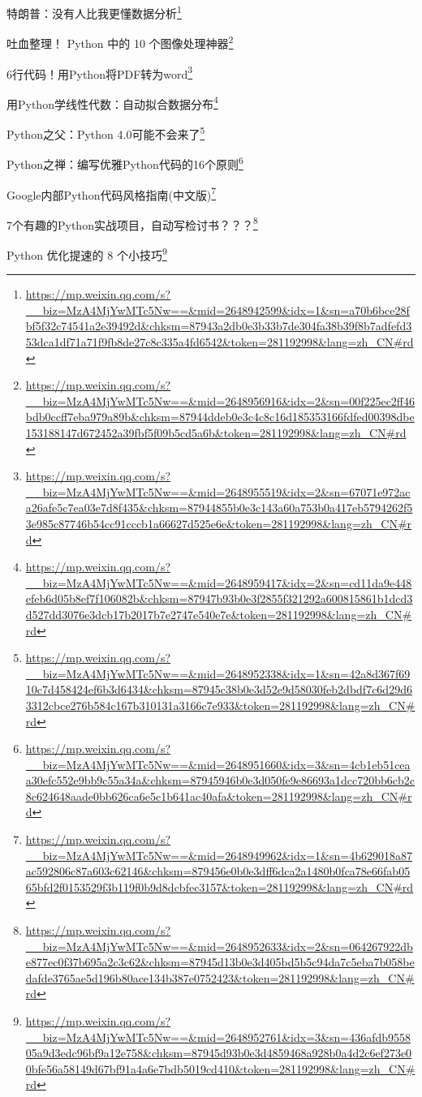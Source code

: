 \documentclass[]{ctexbook}
\renewcommand{\href}[2]{#2\footnote{\url{#1}}}
\begin{document}
\href{https://mp.weixin.qq.com/s?__biz=MzA4MjYwMTc5Nw==\&mid=2648942599\&idx=1\&sn=a70b6bce28fbf5f32c74541a2e39492d\&chksm=87943a2db0e3b33b7de304fa38b39f8b7adfefd353dca1df71a71f9fb8de27c8c335a4fd6542\&token=281192998\&lang=zh_CN\#rd}{特朗普：没有人比我更懂数据分析}

\href{https://mp.weixin.qq.com/s?__biz=MzA4MjYwMTc5Nw==\&mid=2648956916\&idx=2\&sn=00f225ec2ff46bdb0ccff7eba979a89b\&chksm=87944ddeb0e3c4c8c16d185353166fdfed00398dbe153188147d672452a39fbf5f09b5cd5a6b\&token=281192998\&lang=zh_CN\#rd}{吐血整理！ Python 中的 10 个图像处理神器}

\href{https://mp.weixin.qq.com/s?__biz=MzA4MjYwMTc5Nw==\&mid=2648955519\&idx=2\&sn=67071e972aca26afe5c7ea03e7d8f435\&chksm=87944855b0e3c143a60a753b0a417eb5794262f53e985c87746b54cc91cccb1a66627d525e6e\&token=281192998\&lang=zh_CN\#rd}{6行代码！用Python将PDF转为word}

\href{https://mp.weixin.qq.com/s?__biz=MzA4MjYwMTc5Nw==\&mid=2648959417\&idx=2\&sn=cd11da9e448efeb6d05b8ef7f106082b\&chksm=87947b93b0e3f2855f321292a600815861b1dcd3d527dd3076e3dcb17b2017b7e2747e540e7e\&token=281192998\&lang=zh_CN\#rd}{用Python学线性代数：自动拟合数据分布}

\href{https://mp.weixin.qq.com/s?__biz=MzA4MjYwMTc5Nw==\&mid=2648952338\&idx=1\&sn=42a8d367f6910c7d458424ef6b3d6434\&chksm=87945c38b0e3d52e9d58030feb2dbdf7c6d29d63312cbce276b584c167b310131a3166c7e933\&token=281192998\&lang=zh_CN\#rd}{Python之父：Python 4.0可能不会来了}

\href{https://mp.weixin.qq.com/s?__biz=MzA4MjYwMTc5Nw==\&mid=2648951660\&idx=3\&sn=4cb1eb51ceaa30efc552e9bb9c55a34a\&chksm=87945946b0e3d050fe9e86693a1dcc720bb6cb2c8c624648aade0bb626ca6e5c1b641ac40afa\&token=281192998\&lang=zh_CN\#rd}{Python之禅：编写优雅Python代码的16个原则}

\href{https://mp.weixin.qq.com/s?__biz=MzA4MjYwMTc5Nw==\&mid=2648949962\&idx=1\&sn=4b629018a87ac592806c87a603c62146\&chksm=879456e0b0e3dff6dca2a1480b0fca78e66fab0565bfd2f0153529f3b119f0b9d8dcbfec3157\&token=281192998\&lang=zh_CN\#rd}{Google内部Python代码风格指南(中文版)}

\href{https://mp.weixin.qq.com/s?__biz=MzA4MjYwMTc5Nw==\&mid=2648952633\&idx=2\&sn=064267922dbe877ec0f37b695a2c3c62\&chksm=87945d13b0e3d405bd5b5c94da7c5eba7b058bedafde3765ae5d196b80ace134b387e0752423\&token=281192998\&lang=zh_CN\#rd}{7个有趣的Python实战项目，自动写检讨书？？？}

\href{https://mp.weixin.qq.com/s?__biz=MzA4MjYwMTc5Nw==\&mid=2648952761\&idx=3\&sn=436afdb955805a9d3edc96bf9a12e758\&chksm=87945d93b0e3d4859468a928b0a4d2c6ef273e00bfe56a58149d67bf91a4a6e7bdb5019cd410\&token=281192998\&lang=zh_CN\#rd}{Python 优化提速的 8 个小技巧}
\end{document}
